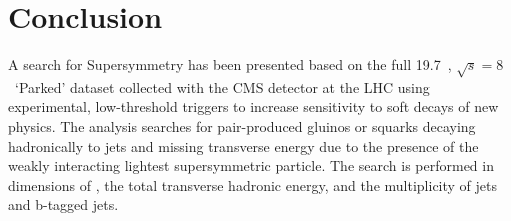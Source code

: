 \chapter{Conclusion}
\label{ch:conclusion}

\ifpdf
    \graphicspath{{Chapter10/Figs/Raster/}{Chapter10/Figs/PDF/}{Chapter10/Figs/}}
\else
    \graphicspath{{Chapter10/Figs/Vector/}{Chapter10/Figs/}}
\fi
















A search for Supersymmetry has been presented based on the full 19.7~\fb, 
$\sqrt{s} = 8$~\tev `Parked' dataset collected with the CMS detector at the LHC
using experimental, low-threshold triggers to increase sensitivity to soft
decays of new physics. The
analysis searches for pair-produced gluinos or squarks decaying hadronically to
jets and missing transverse energy due to the presence of the weakly interacting
lightest supersymmetric particle. The search is performed in dimensions of \HT,
the total transverse hadronic energy, and the multiplicity of jets and b-tagged
jets.

